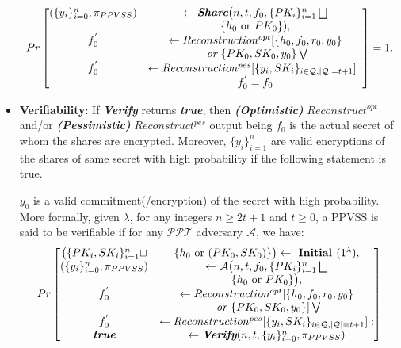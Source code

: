 \begin{itemize}
        \begin{align*}
          Pr\begin{bmatrix}
            (\{y_i\}_{i=0}^n,\pi_{PPVSS})&\leftarrow \textit{\textbf{Share}} \big(n,t,f_0,\{PK_i\}_{i=1}^n\bigsqcup\\
            &\{h_0\text{ or }PK_0\}),\\
            f_0^{'}&\leftarrow Reconstruction^{opt}[\{h_0,f_0,r_0,y_0\}\\
            &\textit{ or }\{PK_0,SK_0,y_0\}\bigvee\\
            f_0^{'}&\leftarrow Reconstruction^{pes}[\{y_i,SK_i\}_{i\in\mathcal{Q},|\mathcal{Q}|=t+1}]:\\
            &f_0^{'}=f_0
          \end{bmatrix} = 1.
        \end{align*}
  \item \textbf{Verifiability}: If \textit{\textbf{Verify}} returns \textit{\textbf{true}}, then 
    \textit{\textbf{(Optimistic)}} $Reconstruct^{opt}$ and/or \textit{\textbf{(Pessimistic)}} $Reconstruct^{pes}$ 
    output being $f_0$ is the actual secret of whom the shares are encrypted. Moreover, 
    $\{y_i\}_{i=1}^n$ are valid encryptions of the shares of same secret with 
    high probability if the following statement is true.\par
    $y_0$ is a valid commitment(/encryption) of the secret with high 
        probability. More formally, given $\lambda$, for any integers 
        $n\geq 2t+1$ and $t\geq0$, a PPVSS is said to be verifiable if for any 
        $\mathcal{PPT}$ adversary $\mathcal{A}$, we have:
        \begin{align*}
          Pr\begin{bmatrix}
            \big(\{PK_i,SK_i\}_{i=1}^n\sqcup&\{h_0\text{ or }(PK_0,SK_0)\}\big)\leftarrow\textbf{ Initial } (1^\lambda),\\
            (\{y_i\}_{i=0}^n,\pi_{PPVSS})&\leftarrow \mathcal{A} \big(n,t,f_0,\{PK_i\}_{i=1}^n\bigsqcup\\
            &\{h_0\text{ or }PK_0\}\big),\\
            f_0^{'}&\leftarrow Reconstruction^{opt}[\{h_0,f_0,r_0,y_0\}\\
            &\textit{ or }\{PK_0,SK_0,y_0\}]\bigvee\\
            f_0^{'}&\leftarrow Reconstruction^{pes}[\{y_i,SK_i\}_{i\in\mathcal{Q},|\mathcal{Q}|=t+1}]:\\
            \textit{\textbf{true}}&\leftarrow \textit{\textbf{Verify}} (n,t,\{y_i\}_{i=0}^n,\pi_{PPVSS})

\end{bmatrix}
\end{align*}
\end{itemize}
